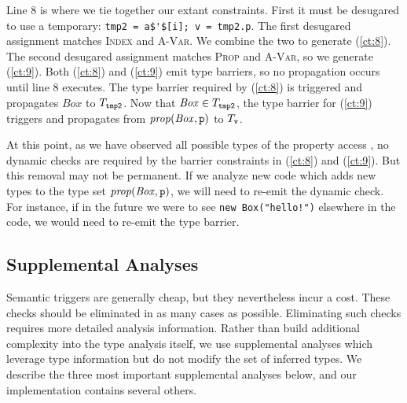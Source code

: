 Line 8 is where we tie together our extant constraints. First it must be
desugared to use a temporary: \lstinline{tmp2 = a$'$[i]; v = tmp2.p}. The
first desugared assignment matches \textsc{Index} and \textsc{A-Var}. We
combine the two to generate (\ref{ct:8}). The second desugared assignment
matches \textsc{Prop} and \textsc{A-Var}, so we generate (\ref{ct:9}). Both
(\ref{ct:8}) and (\ref{ct:9}) emit type barriers, so no propagation occurs
until line 8 executes.
The type barrier required by (\ref{ct:8}) is triggered and propagates
$\mathit{Box}$ to $T_{\texttt{tmp2}}$. Now that $\mathit{Box} \in
T_{\texttt{tmp2}}$, the type barrier for (\ref{ct:9}) triggers and propagates
 from $\mathit{prop}(\mathit{Box}, \texttt{p})$ to $T_{\texttt{v}}$.

At this point, as we have observed all possible types of the property access
, no dynamic checks are required by the barrier constraints
in (\ref{ct:8}) and (\ref{ct:9}).
But this removal may
not be permanent. If we analyze new code which adds new types to the type set
$\mathit{prop}(\mathit{Box}, \texttt{p})$, we will need to re-emit the dynamic
check. For instance, if in the future we were to see \lstinline{new Box("hello!")}
elsewhere in the code, we would need to re-emit the type barrier.

\subsection{Supplemental Analyses}
\label{sec:supplemental-analyses}

Semantic triggers are generally cheap, but they nevertheless incur a cost.
These checks should be eliminated in as many cases as possible.
Eliminating such checks requires more detailed analysis information.
Rather than build additional complexity into the type analysis itself,
we use supplemental analyses which leverage type information but do not
modify the set of inferred types.
We describe the three most important supplemental analyses below, and
our implementation contains several others.

